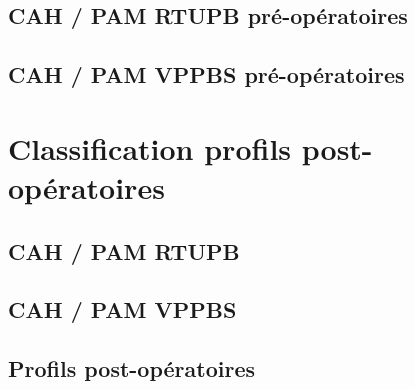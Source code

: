 \documentclass[12pt]{article}
\begin{document}
\subsection{CAH / PAM RTUPB pré-opératoires }
	  
\subsection{CAH / PAM VPPBS  pré-opératoires }
	  


%


\section{Classification profils post-opératoires}
\subsection{CAH / PAM RTUPB }
	  
\subsection{CAH / PAM VPPBS }
	  
\subsection{Profils post-opératoires}
	  




\end{document}
